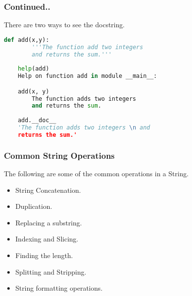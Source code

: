 \documentclass{beamer}
\begin{document}
\begin{frame}[fragile]
\frametitle{Continued..}
There are two ways to see the docstring.

\begin{lstlisting}[language=Python]
	def add(x,y):
		'''The function add two integers
		and returns the sum.'''
	 
	help(add)
	Help on function add in module __main__:

	add(x, y)
    	The function adds two integers 
    	and returns the sum.
    	
    add.__doc__
    'The function adds two integers \n and 
    returns the sum.'
\end{lstlisting}
\end{frame}

\begin{frame}
\frametitle{Common String Operations}
The following are some of the common operations in a String.
\begin{itemize}
\item String Concatenation.
\item Duplication.
\item Replacing a substring.
\item Indexing and Slicing.
\item Finding the length.
\item Splitting and Stripping.
\item String formatting operations.
\end{itemize}
\end{frame}
\end{document}
